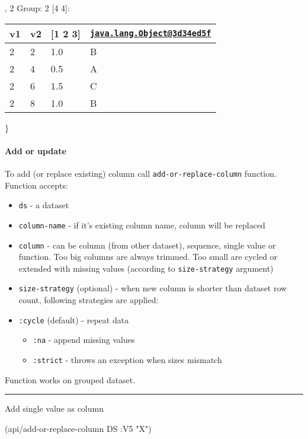 \documentclass[]{article}
\newenvironment{Shaded}{\begin{snugshade}}{\end{snugshade}}
\newcommand{\AttributeTok}[1]{\textcolor[rgb]{0.77,0.63,0.00}{#1}}
\newcommand{\NormalTok}[1]{#1}
\newcommand{\StringTok}[1]{\textcolor[rgb]{0.31,0.60,0.02}{#1}}
\providecommand{\tightlist}{%
  \setlength{\itemsep}{0pt}\setlength{\parskip}{0pt}}
\let\oldparagraph\paragraph
\renewcommand{\paragraph}[1]{\oldparagraph{#1}\mbox{}}
\begin{document}
, 2 Group: 2 {[}4 4{]}:

\begin{longtable}[]{@{}llll@{}}
\toprule
v1 & v2 & {[}1 2 3{]} &
\href{mailto:java.lang.Object@3d34ed5f}{\nolinkurl{java.lang.Object@3d34ed5f}}\tabularnewline
\midrule
\endhead
2 & 2 & 1.0 & B\tabularnewline
2 & 4 & 0.5 & A\tabularnewline
2 & 6 & 1.5 & C\tabularnewline
2 & 8 & 1.0 & B\tabularnewline
\bottomrule
\end{longtable}

\}

\hypertarget{add-or-update}{%
\paragraph{Add or update}\label{add-or-update}}

To add (or replace existing) column call \texttt{add-or-replace-column}
function. Function accepts:

\begin{itemize}
\tightlist
\item
  \texttt{ds} - a dataset
\item
  \texttt{column-name} - if it's existing column name, column will be
  replaced
\item
  \texttt{column} - can be column (from other dataset), sequence, single
  value or function. Too big columns are always trimmed. Too small are
  cycled or extended with missing values (according to
  \texttt{size-strategy} argument)
\item
  \texttt{size-strategy} (optional) - when new column is shorter than
  dataset row count, following strategies are applied:
\item
  \texttt{:cycle} (default) - repeat data

  \begin{itemize}
  \tightlist
  \item
    \texttt{:na} - append missing values
  \item
    \texttt{:strict} - throws an exception when sizes mismatch
  \end{itemize}
\end{itemize}

Function works on grouped dataset.

\begin{center}\rule{0.5\linewidth}{0.5pt}\end{center}

Add single value as column

\begin{Shaded}
\begin{Highlighting}[]
\NormalTok{(api/add-or-replace-column DS }\AttributeTok{:V5} \StringTok{"X"}\NormalTok{)}
\end{Highlighting}
\end{Shaded}
\end{document}

